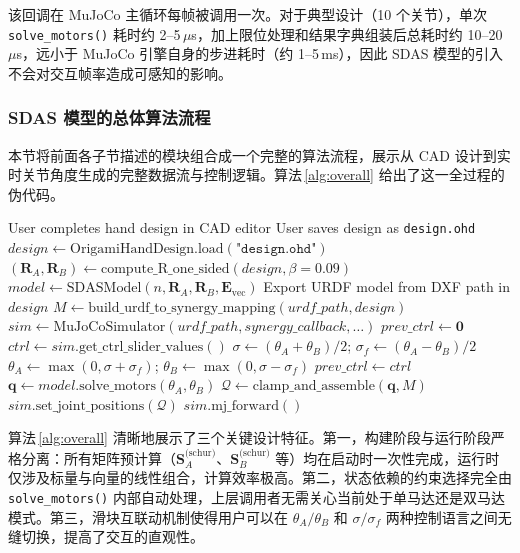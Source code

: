 该回调在 MuJoCo 主循环每帧被调用一次。对于典型设计（10 个关节），单次 \texttt{solve\_motors()} 耗时约 2--5\,$\mu$s，加上限位处理和结果字典组装后总耗时约 10--20\,$\mu$s，远小于 MuJoCo 引擎自身的步进耗时（约 1--5\,ms），因此 SDAS 模型的引入不会对交互帧率造成可感知的影响。

\subsubsection{SDAS 模型的总体算法流程}
\label{sec:overall_algorithm}

本节将前面各子节描述的模块组合成一个完整的算法流程，展示从 CAD 设计到实时关节角度生成的完整数据流与控制逻辑。算法\,\ref{alg:overall} 给出了这一全过程的伪代码。

\begin{algorithm}[htbp]
\caption{SDAS 模型从 CAD 设计到实时关节角度生成的完整流程}
\label{alg:overall}
\begin{algorithmic}[1]
\Require User completes hand design in CAD editor
\State User saves design as \texttt{design.ohd}
\State $design \gets \text{OrigamiHandDesign.load}(\texttt{"design.ohd"})$
\State $(\mathbf{R}_A, \mathbf{R}_B) \gets \text{compute\_R\_one\_sided}(design, \beta=0.09)$
\State $model \gets \text{SDASModel}(n, \mathbf{R}_A, \mathbf{R}_B, \mathbf{E}_{\text{vec}})$
\State Export URDF model from DXF path in $design$
\State $M \gets \text{build\_urdf\_to\_synergy\_mapping}(urdf\_path, design)$
\State $sim \gets \text{MuJoCoSimulator}(urdf\_path, synergy\_callback, \ldots)$
\State $prev\_ctrl \gets \mathbf{0}$
    \State $ctrl \gets sim.\text{get\_ctrl\_slider\_values}()$
        \State $\sigma \gets (\theta_A + \theta_B) / 2$; $\sigma_f \gets (\theta_A - \theta_B) / 2$
    \Else
        \State $\theta_A \gets \max(0, \sigma + \sigma_f)$; $\theta_B \gets \max(0, \sigma - \sigma_f)$
    \EndIf
    \State $prev\_ctrl \gets ctrl$
    \State $\mathbf{q} \gets model.\text{solve\_motors}(\theta_A, \theta_B)$
    \State $\mathcal{Q} \gets \text{clamp\_and\_assemble}(\mathbf{q}, M)$
    \State $sim.\text{set\_joint\_positions}(\mathcal{Q})$
    \State $sim.\text{mj\_forward}()$
\EndWhile
\end{algorithmic}
\end{algorithm}

算法\,\ref{alg:overall} 清晰地展示了三个关键设计特征。第一，构建阶段与运行阶段严格分离：所有矩阵预计算（$\mathbf{S}_A^{\text{(schur)}}$、$\mathbf{S}_B^{\text{(schur)}}$ 等）均在启动时一次性完成，运行时仅涉及标量与向量的线性组合，计算效率极高。第二，状态依赖的约束选择完全由 \texttt{solve\_motors()} 内部自动处理，上层调用者无需关心当前处于单马达还是双马达模式。第三，滑块互联动机制使得用户可以在 $\theta_A/\theta_B$ 和 $\sigma/\sigma_f$ 两种控制语言之间无缝切换，提高了交互的直观性。

